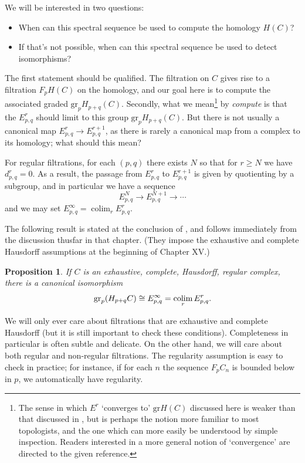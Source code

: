 \documentclass{memo-l}
\DeclareMathOperator{\colim}{colim}
\newtheorem{proposition}[theorem]{Proposition}
\theoremstyle{definition}
\theoremstyle{remark}
\numberwithin{section}{chapter}
\numberwithin{equation}{chapter}
\begin{document}
We will be interested in two questions: 

\begin{itemize}
\item When can this spectral sequence be used to compute the homology $H(C)$? 
\item If that's not possible, when can this spectral sequence be used to detect isomorphisms?
\end{itemize}

The first statement should be qualified. The filtration on $C$ gives rise to a filtration $F_p H(C)$ on the homology, and our goal here is to compute the associated graded $\text{gr}_p H_{p+q}(C)$. Secondly, what we mean\footnote{The sense in which $E^r$ `converges to' $\text{gr} H(C)$ discussed here is weaker than that discussed in \cite[Chapter XV.2]{CE}, but is perhaps the notion more familiar to most topologists, and the one which can more easily be understood by simple inspection. Readers interested in a more general notion of `convergence' are directed to the given reference.} by \emph{compute} is that the $E^r_{p,q}$ should limit to this group $\text{gr}_p H_{p+q}(C)$. But there is not usually a canonical map $E^r_{p,q} \to E^{r+1}_{p,q}$, as there is rarely a canonical map from a complex to its homology; what should this mean? 

For regular filtrations, for each $(p,q)$ there exists $N$ so that for $r \ge N$ we have $d^r_{p,q} = 0$. As a result, the passage from $E^r_{p,q}$ to $E^{r+1}_{p,q}$ is given by quotienting by a subgroup, and in particular we have a sequence $$E^N_{p,q} \to E^{N+1}_{p,q} \to \cdots$$ and we may set $E^\infty_{p,q} = \colim_r E^r_{p,q}$. 

The following result is stated at the conclusion of \cite[Chapter XV.4]{CE}, and follows immediately from the discussion thusfar in that chapter. (They impose the exhaustive and complete Hausdorff assumptions at the beginning of Chapter XV.)

\begin{proposition}\label{ssCompute}
If $C$ is an exhaustive, complete, Hausdorff, regular complex, there is a canonical isomorphism $$\textup{gr}_p(H_{p+q} C) \cong E^\infty_{p,q} = \colim_r E^r_{p,q}.$$ 
\end{proposition}

We will only ever care about filtrations that are exhaustive and complete Hausdorff (but it is still important to check these conditions). Completeness in particular is often subtle and delicate. On the other hand, we will care about both regular and non-regular filtrations. The regularity assumption is easy to check in practice; for instance, if for each $n$ the sequence $F_p C_n$ is bounded below in $p$, we automatically have regularity.\\
\end{document}
